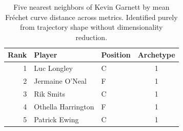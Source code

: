 \begin{table}[htbp]
  \centering\small
  \begin{tabular}{rllc}
    \toprule
    Rank & Player & Position & Archetype \\
    \midrule
    1 & Luc Longley & C & 1 \\
    2 & Jermaine O'Neal & F & 1 \\
    3 & Rik Smits & C & 1 \\
    4 & Othella Harrington & F & 1 \\
    5 & Patrick Ewing & C & 1 \\
    \bottomrule
  \end{tabular}
  \caption{Five nearest neighbors of Kevin Garnett by mean Fr\'{e}chet curve distance across metrics. Identified purely from trajectory shape without dimensionality reduction.}
  \label{tab:Kevin_Garnett_frechet_curve_neighbors}
\end{table}

